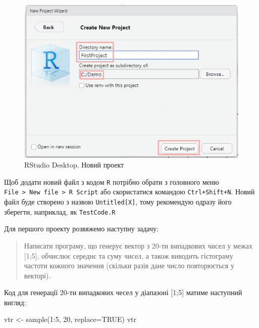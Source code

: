 \documentclass[
]{book}
\newenvironment{Shaded}{\begin{snugshade}}{\end{snugshade}}
\newcommand{\AttributeTok}[1]{\textcolor[rgb]{0.77,0.63,0.00}{#1}}
\newcommand{\ConstantTok}[1]{\textcolor[rgb]{0.00,0.00,0.00}{#1}}
\newcommand{\DecValTok}[1]{\textcolor[rgb]{0.00,0.00,0.81}{#1}}
\newcommand{\FunctionTok}[1]{\textcolor[rgb]{0.00,0.00,0.00}{#1}}
\newcommand{\NormalTok}[1]{#1}
\newcommand{\OtherTok}[1]{\textcolor[rgb]{0.56,0.35,0.01}{#1}}
\newcommand{\SpecialCharTok}[1]{\textcolor[rgb]{0.00,0.00,0.00}{#1}}
\begin{document}
\begin{figure}
\centering
\includegraphics{images/chapter1/rstudio_8.png}
\caption{\label{fig:unnamed-chunk-19}RStudio Desktop. Новий проект}
\end{figure}

Щоб додати новий файл з кодом \texttt{R} потрібно обрати з головного меню \texttt{File\ \textgreater{}\ New\ file\ \textgreater{}\ R\ Script} або скористатися командою \texttt{Ctrl+Shift+N}. Новий файл буде створено з назвою \texttt{Untitled{[}X{]}}, тому рекомендую одразу його зберегти, наприклад, як \texttt{TestCode.R}

Для першого проекту розвяжемо наступну задачу:

\begin{quote}
Написати програму, що генерує вектор з 20-ти випадкових чисел у межах {[}1;5{]}, обчислює середнє та суму чисел, а також виводить гістограму частоти кожного значення (скільки разів дане число повторюється у векторі).
\end{quote}

Код для генерації 20-ти випадкових чесел у діапазоні {[}1;5{]} матиме наступний вигляд:

\begin{Shaded}
\begin{Highlighting}[]
\NormalTok{vtr }\OtherTok{\textless{}{-}} \FunctionTok{sample}\NormalTok{(}\DecValTok{1}\SpecialCharTok{:}\DecValTok{5}\NormalTok{, }\DecValTok{20}\NormalTok{, }\AttributeTok{replace=}\ConstantTok{TRUE}\NormalTok{)}
\NormalTok{vtr}
\end{Highlighting}
\end{Shaded}
\end{document}
